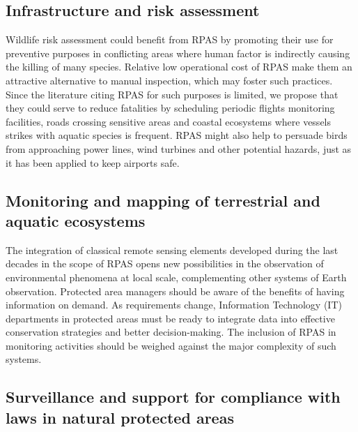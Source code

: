 \documentclass[]{interact}
\theoremstyle{plain}%
\theoremstyle{definition}
\theoremstyle{remark}
\begin{document}
\subsection{Infrastructure and risk
assessment}\label{infrastructure-and-risk-assessment-1}

Wildlife risk assessment could benefit from RPAS by promoting their use
for preventive purposes in conflicting areas where human factor is
indirectly causing the killing of many species. Relative low operational
cost of RPAS make them an attractive alternative to manual inspection,
which may foster such practices. Since the literature citing RPAS for
such purposes is limited, we propose that they could serve to reduce
fatalities by scheduling periodic flights monitoring facilities, roads
crossing sensitive areas and coastal ecosystems where vessels strikes
with aquatic species is frequent. RPAS might also help to persuade birds
from approaching power lines, wind turbines and other potential hazards,
just as it has been applied to keep airports safe.

\subsection{Monitoring and mapping of terrestrial and aquatic
ecosystems}\label{monitoring-and-mapping-of-terrestrial-and-aquatic-ecosystems-1}

The integration of classical remote sensing elements developed during
the last decades in the scope of RPAS opens new possibilities in the
observation of environmental phenomena at local scale, complementing
other systems of Earth observation. Protected area managers should be
aware of the benefits of having information on demand. As requirements
change, Information Technology (IT) departments in protected areas must
be ready to integrate data into effective conservation strategies and
better decision-making. The inclusion of RPAS in monitoring activities
should be weighed against the major complexity of such systems.

\subsection{Surveillance and support for compliance with laws in natural
protected
areas}\label{surveillance-and-support-for-compliance-with-laws-in-natural-protected-areas}
\end{document}
